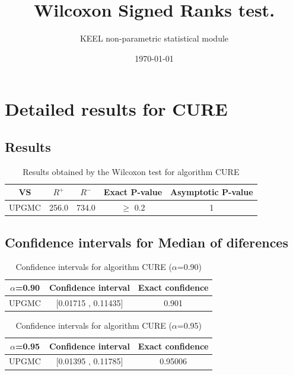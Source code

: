 \documentclass[a4paper,10pt]{article}
\title{Wilcoxon Signed Ranks test.}
\date{\today}
\author{KEEL non-parametric statistical module}
\begin{document}
\pagestyle{empty}
\maketitle
\thispagestyle{empty}



\section{Detailed results for CURE}


\subsection{Results}

\begin{table}[!htp]
\centering\small
\begin{tabular}{
|c|c|c|c|c|}
\hline
 VS & $R^{+}$ & $R^{-}$ & Exact P-value & Asymptotic P-value \\ \hline 
UPGMC & 256.0 & 734.0 & $\geq$ 0.2 & 1\\ \hline 

\end{tabular}
\caption{Results obtained by the Wilcoxon test for algorithm CURE}
\end{table}

\subsection{Confidence intervals for Median of diferences}

\begin{table}[!htp]
\centering\small
\begin{tabular}{
|c|c|c|}
\hline
 $\alpha$=0.90 & Confidence interval & Exact confidence \\ \hline 
UPGMC & [0.01715 , 0.11435] & 0.901\\ \hline 

\end{tabular}
\caption{Confidence intervals for algorithm CURE ($\alpha$=0.90)}
\end{table}
\begin{table}[!htp]
\centering\small
\begin{tabular}{
|c|c|c|}
\hline
 $\alpha$=0.95 & Confidence interval & Exact confidence \\ \hline 
UPGMC & [0.01395 , 0.11785] & 0.95006\\ \hline 

\end{tabular}
\caption{Confidence intervals for algorithm CURE ($\alpha$=0.95)}
\end{table}
\end{document}
